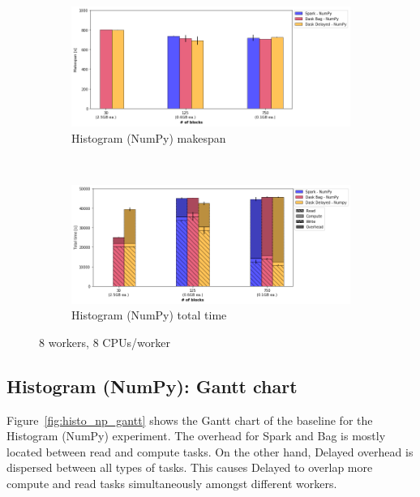 \documentclass[conference]{IEEEtran}
\begin{document}
\begin{figure}[!t]
    \centering
    \begin{subfigure}[b]{\columnwidth}
        \includegraphics[clip,width=\columnwidth]{images/histo_np_block.png}%
        \caption{Histogram (NumPy) makespan}\label{fig:histo_np_ms_block}
    \end{subfigure}
    \\
    \begin{subfigure}[b]{\columnwidth}
        \includegraphics[clip,width=\columnwidth]{images/histo_idle_np_block.png}%
        \caption{Histogram (NumPy) total time}\label{fig:histo_np_tt_block}
    \end{subfigure}
    \caption{8 workers, 8 CPUs/worker}\label{fig:histo_np_block}
\end{figure}

\subsection{Histogram (NumPy): Gantt chart}
Figure~\ref{fig:histo_np_gantt} shows the Gantt chart of the baseline for the
Histogram (NumPy) experiment. The overhead for Spark and Bag is mostly located
between read and compute tasks. On the other hand, Delayed
overhead is dispersed between all types of tasks. This causes Delayed to
overlap more compute and read tasks simultaneously amongst different workers.
\end{document}
